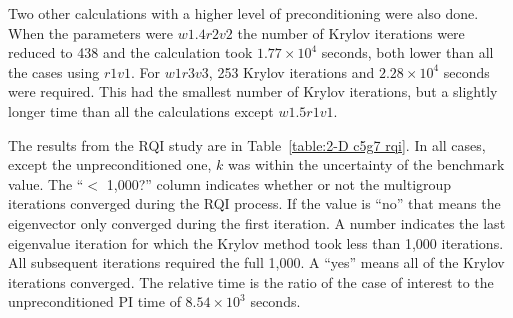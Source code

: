 Two other calculations with a higher level of preconditioning were also done. When the parameters were $w1.4r2v2$ the number of Krylov iterations were reduced to 438 and the calculation took $1.77 \times 10^{4}$ seconds, both lower than all the cases using $r1v1$. For $w1r3v3$, 253 Krylov iterations and $2.28 \times 10^{4}$ seconds were required. This had the smallest number of Krylov iterations, but a slightly longer time than all the calculations except $w1.5r1v1$.	

The results from the RQI study are in Table~\ref{table:2-D c5g7 rqi}. In all cases, except the unpreconditioned one, $k$ was within the uncertainty of the benchmark value. The ``$<$ 1,000?'' column indicates whether or not the multigroup iterations converged during the RQI process. If the value is ``no'' that means the eigenvector only converged during the first iteration. A number indicates the last eigenvalue iteration for which the Krylov method took less than 1,000 iterations. All subsequent iterations required the full 1,000. A ``yes'' means all of the Krylov iterations converged. The relative time is the ratio of the case of interest to the unpreconditioned PI time of $8.54 \times 10^{3}$ seconds.
%
